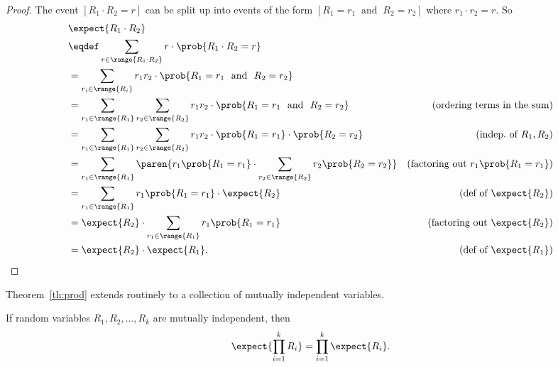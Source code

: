 \begin{proof}
The event $[R_1 \cdot R_2=r]$ can be split up into events of the form
$[R_1 = r_1\ \text{ and }\ R_2 = r_2]$ where $r_1\cdot r_2=r$.  So
\begin{align*}
\lefteqn{\expect{R_1 \cdot R_2}}\\
& \eqdef \sum_{r \in \range{R_1\cdot R_2}} r\cdot \prob{R_1\cdot R_2=r}\\
\iffalse
& =      \sum_{\scriptsize \begin{aligned}
                       r_1 \in \range{R_1},\\
                       r_2 \in \range{R_2}
                      \end{aligned}}\fi
& =      \sum_{r_i \in \range{R_i}}
            r_1 r_2 \cdot \prob{R_1=r_1\ \text{ and }\ R_2=r_2}\\
& =      \sum_{r_1 \in \range{R_1}} \sum_{r_2 \in \range{R_2}}
            r_1 r_2 \cdot \prob{R_1=r_1\ \text{ and }\ R_2=r_2}
                    &\text{(ordering terms in the sum)}\\
& =      \sum_{r_1 \in \range{R_1}} \sum_{r_2 \in \range{R_2}}
            r_1 r_2 \cdot \prob{R_1=r_1}\cdot \prob{R_2=r_2}
                    &\text{(indep.\ of $R_1,R_2$)}\\
& =      \sum_{r_1 \in \range{R_1}} \paren{r_1\prob{R_1=r_1} \cdot
              \sum_{r_2 \in \range{R_2}} r_2 \prob{R_2=r_2}}
                    &\text{(factoring out $r_1\prob{R_1=r_1}$)}\\
& =      \sum_{r_1 \in \range{R_1}} r_1\prob{R_1=r_1} \cdot \expect{R_2}
                    &\text{(def of $\expect{R_2}$)}\\
& =       \expect{R_2} \cdot \sum_{r_1 \in \range{R_1}} r_1\prob{R_1=r_1}
                    &\text{(factoring out $\expect{R_2}$)}\\
& =       \expect{R_2} \cdot  \expect{R_1}.
                    &\text{(def of $\expect{R_1}$)}
\end{align*}

\end{proof}

Theorem~\ref{th:prod} extends routinely to a collection of mutually
independent variables.
\begin{corollary}
If random variables $R_1, R_2, \dots, R_k$ are mutually
independent, then
\[
\expect{\prod_{i=1}^k R_i} = \prod_{i=1}^k \expect{R_i}.
\]
\end{corollary}


\begin{problems}
\practiceproblems
{}

\classproblems
{}

\homeworkproblems
{}
\end{problems}


\endinput
